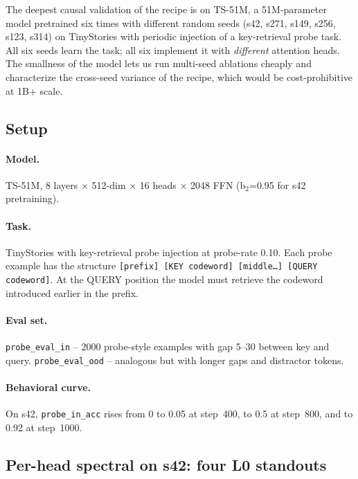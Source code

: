 \documentclass[11pt]{article}
\begin{document}
The deepest causal validation of the recipe is on TS-51M, a 51M-parameter model pretrained six times with different random seeds (s42, s271, s149, s256, s123, s314) on TinyStories \citep{eldan2023tinystories} with periodic injection of a key-retrieval probe task. All six seeds learn the task; all six implement it with \emph{different} attention heads. The smallness of the model lets us run multi-seed ablations cheaply and characterize the cross-seed variance of the recipe, which would be cost-prohibitive at 1B+ scale.

\subsection{Setup}

\paragraph{Model.} TS-51M, 8 layers $\times$ 512-dim $\times$ 16 heads $\times$ 2048 FFN (b$_2$=0.95 for s42 pretraining).

\paragraph{Task.} TinyStories with key-retrieval probe injection at probe-rate 0.10. Each probe example has the structure \texttt{[prefix] [KEY codeword] [middle\dots] [QUERY codeword]}. At the QUERY position the model must retrieve the codeword introduced earlier in the prefix.

\paragraph{Eval set.} \texttt{probe\_eval\_in} -- 2000 probe-style examples with gap 5--30 between key and query. \texttt{probe\_eval\_ood} -- analogous but with longer gaps and distractor tokens.

\paragraph{Behavioral curve.} On s42, \texttt{probe\_in\_acc} rises from 0 to 0.05 at step~400, to 0.5 at step~800, and to 0.92 at step~1000.

\subsection{Per-head spectral on s42: four L0 standouts}
\label{sec:s42_per_head}
\end{document}
